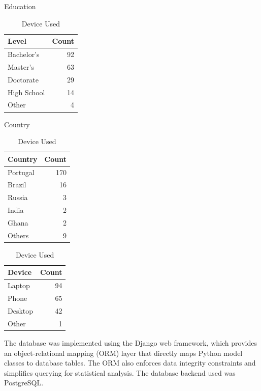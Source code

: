 \begin{table}
    \begin{subtable}{0.3\textwidth}
        \centering
        \caption{Education}
        \begin{tabular}{lr}
            \hline
            Level & Count \\
            \hline
            Bachelor's & 92 \\
            Master's & 63 \\
            Doctorate & 29 \\
            High School & 14 \\
            Other & 4 \\
            \hline
        \end{tabular}
    \end{subtable}
    \hfill
    \begin{subtable}{0.3\textwidth}
        \centering
        \caption{Country}
        \begin{tabular}{lr}
            \hline
            Country & Count \\
            \hline
            Portugal & 170 \\
            Brazil & 16 \\
            Russia & 3  \\
            India & 2 \\
            Ghana & 2 \\
            Others & 9 \\
            \hline
        \end{tabular}
    \end{subtable}
    \hfill
    \begin{subtable}{0.3\textwidth}
        \centering
        \caption{Device Used}
        \begin{tabular}{lr}
            \hline
            Device & Count \\
            \hline
            Laptop & 94 \\
            Phone & 65 \\
            Desktop & 42 \\
            Other & 1 \\
            \hline
        \end{tabular}
    \end{subtable}
\end{table}

The database was implemented using the Django web framework, which provides an object-relational mapping (ORM) layer that directly maps Python model classes to database tables. The ORM also enforces data integrity constraints and simplifies querying for statistical analysis. The database backend used was PostgreSQL.

